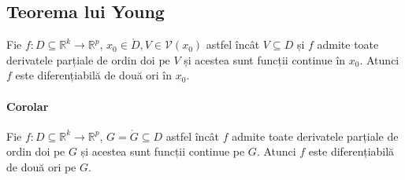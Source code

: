 \subsection{Teorema lui Young}
Fie $f:D \subseteq \mathbb{R}^{k} \rightarrow \mathbb{R}^{p}$, $x_{0} \in \mathring{D}, V \in \mathcal{V}(x_{0})$ astfel încât
$V \subseteq D$ și $f$ admite toate derivatele parțiale de ordin doi pe $V$ și acestea sunt funcții continue în $x_{0}$. Atunci
$f$ este diferențiabilă de două ori în $x_{0}$.

\paragraph{Corolar}
Fie $f:D \subseteq \mathbb{R}^{k} \rightarrow \mathbb{R}^{p}$, $G = \mathring{G} \subseteq D$ astfel încât
$f$ admite toate derivatele parțiale de ordin doi pe $G$ și acestea sunt funcții continue pe $G$.
Atunci $f$ este diferențiabilă de două ori pe $G$.
